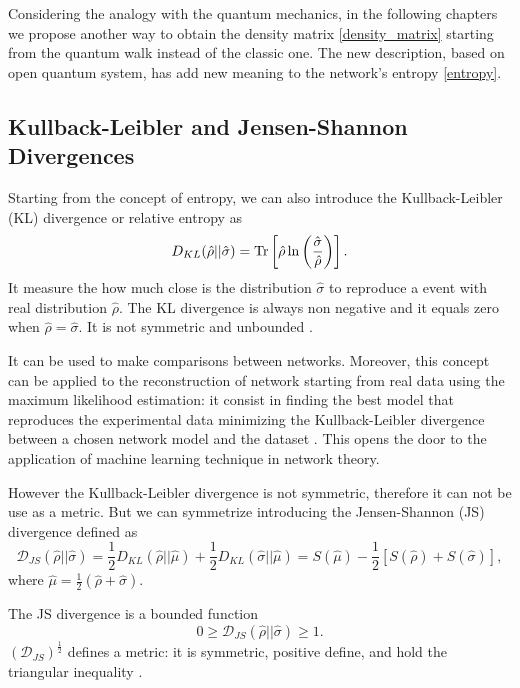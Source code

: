Considering the analogy with the quantum mechanics, in the following chapters we propose another way to obtain the density matrix \eqref{density_matrix} starting from the quantum walk instead of the classic one. The new description, based on open quantum system, has add new meaning to the network's entropy \eqref{entropy}.

\subsection{Kullback-Leibler and Jensen-Shannon Divergences}
Starting from the concept of entropy, we can also introduce the Kullback-Leibler (KL) divergence or relative entropy \cite{K-L_divergence} as
\begin{equation}\label{KL_divergence}
    D_{KL}(\hat \rho || \hat \sigma) = \operatorname{Tr} \left[\hat \rho \ln\left(\frac{\hat\sigma}{\hat\rho}\right)\right].
\end{equation}
It measure the how much close is the distribution $\hat \sigma$ to reproduce a event with real distribution $\hat \rho$. 
The KL divergence is always non negative and it equals zero when $\hat \rho = \hat \sigma$. It is not symmetric and unbounded \cite{J-S_divergence}.

It can be used to make comparisons between networks. Moreover, this concept can be applied to the reconstruction of network starting from real data using the maximum likelihood estimation: it consist in finding the best model that reproduces the experimental data minimizing the Kullback-Leibler divergence between a chosen network model and the dataset \cite{De_Domenico_2016}. This opens the door to the application of machine learning technique in network theory.

However the Kullback-Leibler divergence is not symmetric, therefore it can not be use as a metric. 
But we can symmetrize introducing the Jensen-Shannon (JS) divergence \cite{J-S_divergence} defined as
\begin{equation}\label{JS_metric}
    \mathcal{D}_{JS}(\hat\rho||\hat\sigma) =  \frac{1}{2}D_{KL}(\hat \rho || \hat \mu) + \frac{1}{2}D_{KL}(\hat \sigma || \hat \mu) = S(\hat\mu)-\frac{1}{2}\left[S(\hat\rho) + S(\hat\sigma)\right],
\end{equation}
where $\hat\mu =\frac{1}{2}(\hat\rho+\hat\sigma)$. 

The JS divergence is a bounded function \cite{J-S_divergence}
\begin{equation}
    0 \geq \mathcal{D}_{JS}(\hat\rho||\hat\sigma) \geq 1.
\end{equation}
$\left(\mathcal{D}_{JS}\right)^{\frac{1}{2}}$ defines a metric: it is symmetric, positive define, and hold the triangular inequality \cite{Jensen-Shannon_divergence}. 

